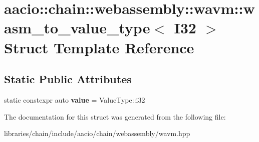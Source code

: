 \hypertarget{structaacio_1_1chain_1_1webassembly_1_1wavm_1_1wasm__to__value__type_3_01_i32_01_4}{}\section{aacio\+:\+:chain\+:\+:webassembly\+:\+:wavm\+:\+:wasm\+\_\+to\+\_\+value\+\_\+type$<$ I32 $>$ Struct Template Reference}
\label{structaacio_1_1chain_1_1webassembly_1_1wavm_1_1wasm__to__value__type_3_01_i32_01_4}
\subsection*{Static Public Attributes}
\begin{DoxyCompactItemize}
\item 
\mbox{\label{structaacio_1_1chain_1_1webassembly_1_1wavm_1_1wasm__to__value__type_3_01_i32_01_4_a5de86565efe42c56496ecb08b2b1764c}} 
static constexpr auto {\bfseries value} = Value\+Type\+::i32
\end{DoxyCompactItemize}


The documentation for this struct was generated from the following file\+:\begin{DoxyCompactItemize}
\item 
libraries/chain/include/aacio/chain/webassembly/wavm.\+hpp\end{DoxyCompactItemize}
